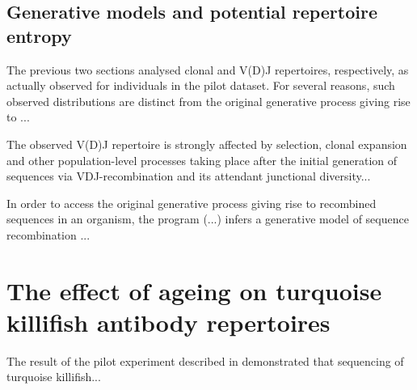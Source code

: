 
\subsection{Generative models and potential repertoire entropy}

The previous two sections analysed clonal and V(D)J repertoires, respectively, as actually observed for individuals in the pilot dataset. For several reasons, such observed distributions are distinct from the original generative process giving rise to ...


The observed V(D)J repertoire is strongly affected by selection, clonal expansion and other population-level processes taking place after the initial generation of \igh{} sequences via VDJ-recombination and its attendant junctional diversity...

In order to access the original generative process giving rise to recombined \igh{} sequences in an organism, the program  (...) infers a generative model of sequence recombination ... %










\section{The effect of ageing on turquoise killifish antibody repertoires}
\label{sec:igseq_ageing}

The result of the pilot experiment described in  demonstrated that \Igseq sequencing of turquoise killifish... %

